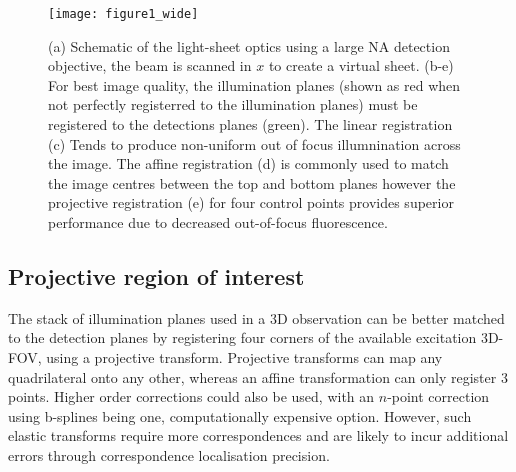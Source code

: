 \begin{figure}
  \texttt{[image: figure1\_wide]}
  \caption{
  (a) Schematic of the %
  light-sheet optics using a large NA detection objective, the beam is scanned in $x$ to create a virtual sheet.
  (b-e) For best image quality, the illumination planes (shown as red when not perfectly registerred to the illumination planes) must be registered to the detections planes (green).
  The linear registration (c) Tends to produce non-uniform out of focus illumnination across the image.
  The affine registration (d) is commonly used to match the image centres between the top and bottom planes however the projective registration (e) for four control points provides superior performance due to decreased out-of-focus fluorescence.
  }
  \label{fig:1}
\end{figure}


\subsection{Projective region of interest}

The stack of illumination planes used in a 3D observation can be better matched to the detection planes by registering four corners of the available excitation 3D-FOV, using a projective transform.%
Projective transforms can map any quadrilateral onto any other, whereas an affine transformation can only register 3 points.
Higher order corrections could also be used, with an $n$-point correction using b-splines being one, computationally expensive option.
However, such elastic transforms require more correspondences and are likely to incur additional errors through correspondence localisation precision.%

